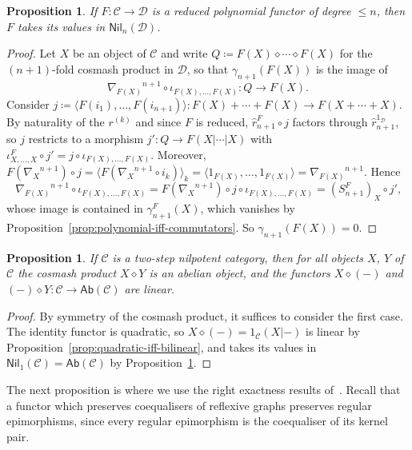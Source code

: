 \documentclass[reqno,a4paper]{amsart}
\theoremstyle{plain}
\newtheorem{proposition}[subsection]{Proposition}
\theoremstyle{definition}
\newcommand{\DefEq}{\coloneq}
\newcommand{\C}{\ensuremath{\mathcal{C}}}
\newcommand{\D}{\ensuremath{\mathcal{D}}}
\newcommand{\Ab}{\ensuremath{\mathsf{Ab}}}
\newcommand{\Nil}{\ensuremath{\mathsf{Nil}}}
\newcommand{\cosmash}{\ensuremath{\diamond}}
\newcommand{\cmF}[2]{\ensuremath{\hat{r}^{#1}_{#2}}}       %
\newcommand{\fold}[1]{\ensuremath{\nabla_{#1}}}            %
\begin{document}
\begin{proposition}\label{prop:polynomial-values-nilpotent}
  If \(F\colon \C\to\D\) is a reduced polynomial functor of degree \(\leq n\), then \(F\) takes its values in \(\Nil_{n}(\D)\).
\end{proposition}

\begin{proof}
  Let \(X\) be an object of \(\C\) and write \(Q\DefEq F(X)\cosmash\cdots\cosmash F(X)\) for the \((n+1)\)-fold cosmash product in \(\D\), so that \(\gamma_{n+1}(F(X))\) is the image of
  \[
    \fold{F(X)}^{n+1}\circ\iota_{F(X),\dots,F(X)}\colon Q\to F(X)\text{.}
  \]
  Consider \(j\DefEq\langle F(i_{1}),\dots,F(i_{n+1})\rangle\colon F(X)+\cdots+F(X)\to F(X+\cdots+X)\). By naturality of the \(r^{(k)}\) and since \(F\) is reduced, \(\cmF{F}{n+1}\circ j\) factors through \(\hat{r}^{1_{\D}}_{n+1}\), so \(j\) restricts to a morphism \(j'\colon Q\to F(X|\cdots|X)\) with \(\iota^{F}_{X,\dots,X}\circ j'=j\circ\iota_{F(X),\dots,F(X)}\). Moreover, \(F(\fold{X}^{n+1})\circ j=\langle F(\fold{X}^{n+1}\circ i_{k})\rangle_{k}=\langle 1_{F(X)},\dots,1_{F(X)}\rangle=\fold{F(X)}^{n+1}\). Hence
  \[
    \fold{F(X)}^{n+1}\circ\iota_{F(X),\dots,F(X)}=F(\fold{X}^{n+1})\circ j\circ\iota_{F(X),\dots,F(X)}=(S^{F}_{n+1})_{X}\circ j'\text{,}
  \]
  whose image is contained in \(\gamma^{F}_{n+1}(X)\), which vanishes by Proposition~\ref{prop:polynomial-iff-commutators}. So \(\gamma_{n+1}(F(X))=0\).
\end{proof}

\begin{proposition}\label{prop:cosmash-abelian}
  If \(\C\) is a two-step nilpotent category, then for all objects \(X\), \(Y\) of \(\C\) the cosmash product \(X\cosmash Y\) is an abelian object, and the functors \(X\cosmash(-)\) and \((-)\cosmash Y\colon \C\to\Ab(\C)\) are linear.
\end{proposition}

\begin{proof}
  By symmetry of the cosmash product, it suffices to consider the first case. The identity functor is quadratic, so \(X\cosmash(-)=1_{\C}(X|-)\) is linear by Proposition~\ref{prop:quadratic-iff-bilinear}, and takes its values in \(\Nil_{1}(\C)=\Ab(\C)\) by Proposition~\ref{prop:polynomial-values-nilpotent}.
\end{proof}

The next proposition is where we use the right exactness results of~\cite{DHVdL}. Recall that a functor which preserves coequalisers of reflexive graphs preserves regular epimorphisms, since every regular epimorphism is the coequaliser of its kernel pair.
\end{document}

